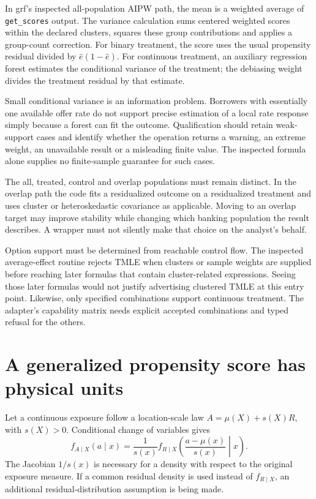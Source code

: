 In grf's inspected all-population AIPW path, the mean is a weighted average of
\texttt{get\_scores} output. The variance calculation sums centered weighted
scores within the declared clusters, squares these group contributions and
applies a group-count correction. For binary treatment, the score uses the
usual propensity residual divided by $\widehat e(1-\widehat e)$. For continuous
treatment, an auxiliary regression forest estimates the conditional variance
of the treatment; the debiasing weight divides the treatment residual by that
estimate. \cite{v131_sw_grf}

Small conditional variance is an information problem. Borrowers with essentially
one available offer rate do not support precise estimation of a local rate
response simply because a forest can fit the outcome. Qualification should
retain weak-support cases and identify whether the operation returns a
warning, an extreme weight, an unavailable result or a misleading finite value.
The inspected formula alone supplies no finite-sample guarantee for such cases.

The all, treated, control and overlap populations must remain distinct. In the
overlap path the code fits a residualized outcome on a residualized treatment
and uses cluster or heteroskedastic covariance as applicable. Moving to an
overlap target may improve stability while changing which banking population
the result describes. A wrapper must not silently make that choice on the
analyst's behalf. \cite{v131_sw_grf}

Option support must be determined from reachable control flow. The inspected
average-effect routine rejects TMLE when clusters or sample weights are supplied
before reaching later formulas that contain cluster-related expressions. Seeing
those later formulas would not justify advertising clustered TMLE at this entry
point. Likewise, only specified combinations support continuous treatment.
The adapter's capability matrix needs explicit accepted combinations and
typed refusal for the others. \cite{v131_sw_grf}

\section{A generalized propensity score has physical units}

Let a continuous exposure follow a location-scale law
$A=\mu(X)+s(X)R$, with $s(X)>0$. Conditional change of variables gives
\[
 f_{A\mid X}(a\mid x)
 =\frac{1}{s(x)}f_{R\mid X}
       \left(\frac{a-\mu(x)}{s(x)}\middle|x\right).
\]
The Jacobian $1/s(x)$ is necessary for a density with respect to the original
exposure measure. If a common residual density is used instead of
$f_{R\mid X}$, an additional residual-distribution assumption is being made.


